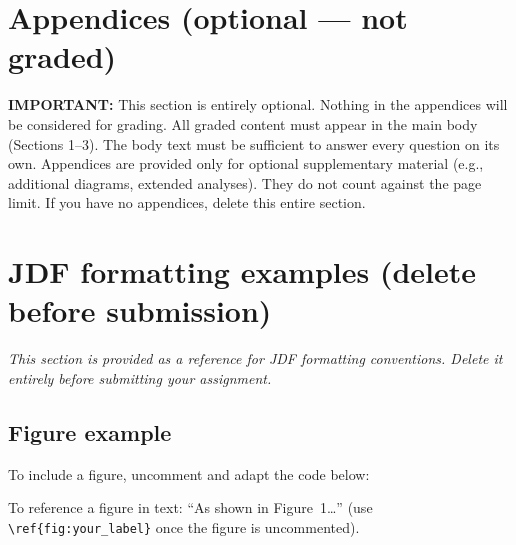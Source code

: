 \documentclass[
	letterpaper, %
]{jdf}
\begin{document}
\section{Appendices (optional --- not graded)}

\textbf{IMPORTANT:} This section is entirely optional. Nothing in the appendices will be considered for grading. All graded content must appear in the main body (Sections 1--3). The body text must be sufficient to answer every question on its own. Appendices are provided only for optional supplementary material (e.g., additional diagrams, extended analyses). They do not count against the page limit. If you have no appendices, delete this entire section.

%



\section*{JDF formatting examples (delete before submission)}

\textit{This section is provided as a reference for JDF formatting conventions.
Delete it entirely before submitting your assignment.}

\subsection*{Figure example}

To include a figure, uncomment and adapt the code below:


To reference a figure in text: ``As shown in Figure~1\ldots'' (use \verb|\ref{fig:your_label}| once the figure is uncommented).
\end{document}
